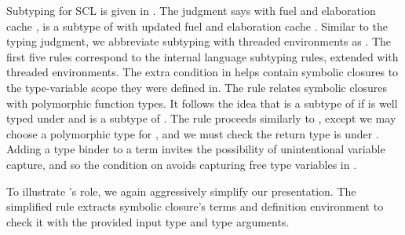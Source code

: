 Subtyping for SCL is given in
  .
The judgment
\ltiSsubtype{\ltimakeCombinedThreadedEnv{\ltiFuel{}}{\ltiClosureCache{}}}
            {\ltiEnv{}}
            {\ltiS{}}
            {\ltiT{}}
            {\ltimakeCombinedThreadedEnv{\ltiFuelp{}}{\ltiClosureCachep{}}}
            says with fuel \ltiFuel{} and elaboration cache \ltiClosureCache{},
            \ltiS{} is a subtype of 
            {\ltiT{}}
            with updated fuel \ltiFuelp{} and elaboration cache \ltiClosureCachep{}.
Similar to the typing judgment, we abbreviate subtyping
with threaded environments as
\ltiSsubtype{\ltiCombinedThreadedEnv{}}
            {\ltiEnv{}}
            {\ltiS{}}
            {\ltiT{}}
            {\ltiCombinedThreadedEnvp{}}.
The first five rules correspond to the internal language subtyping rules,
extended with threaded environments.
The extra condition in \ltiSCSFn helps contain symbolic closures
to the type-variable scope they were defined in.
The rule \ltiSCSClosure relates symbolic closures with polymorphic function types.
It follows the idea that \ltiClosureWithStkID{\ltiEnv{}}
                             {\ltiClosureID{}}
                             {\ltiufun{\ltivar{}}{\ltiE{}}}
                             is a subtype of
\ltiPolyFn{\ltiT{}}{\ova{\ltitvar{}}}{\ltiS{}}
if \ltifuntparamargrettype{\ova{\ltitvar{}}}
                          {\ltivar{}}
                          {\ltiT{}}
                          {\ltiSp{}}
                          {\ltiE{}}
is well typed under \ltiEnv{} and 
\ltiSp{}
is a subtype of
\ltiS{}.
The rule proceeds similarly to \ltiSCAppInfClosure, except we may choose a polymorphic
type for \ltiClosureID{}, and we must check the return type is under \ltiS{}.
Adding a type binder to a term invites the possibility of unintentional 
variable capture, and so 
the condition on \ova{\ltitvar{}} avoids capturing free type variables in \ltiE{}.

To illustrate \ltiSCSClosure's role, we again aggressively simplify our presentation.
The simplified rule \ltiSimpSClosure extracts symbolic closure's terms and definition environment
to check it with the provided input type and type arguments.

